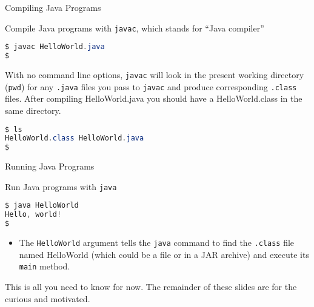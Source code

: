 \documentclass{beamer}
\begin{document}
\begin{frame}[fragile]{Compiling Java Programs}


Compile Java programs with {\tt javac}, which stands for ``Java compiler''
\begin{lstlisting}[language=Java]
$ javac HelloWorld.java
$
\end{lstlisting}
With no command line options, {\tt javac} will look in the present working directory ({\tt pwd}) for any {\tt .java} files you pass to {\tt javac} and produce corresponding {\tt .class} files.  After compiling HelloWorld.java you should have a HelloWorld.class in the same directory.

\begin{lstlisting}[language=Java]
$ ls
HelloWorld.class HelloWorld.java
$
\end{lstlisting}


\end{frame}

\begin{frame}[fragile]{Running Java Programs}


Run Java programs with {\tt java}
\begin{lstlisting}[language=Scala]
$ java HelloWorld
Hello, world!
$
\end{lstlisting}
\begin{itemize}
\item The {\tt HelloWorld} argument tells the {\tt java} command to find the {\tt .class} file named HelloWorld (which could be a file or in a JAR archive) and execute its {\tt main} method.
\end{itemize}
This is all you need to know for now.  The remainder of these slides are for the curious and motivated.
\end{frame}
\end{document}
